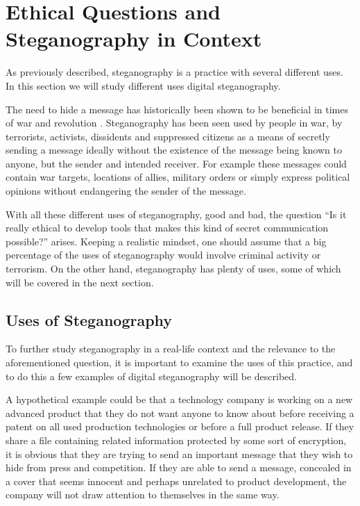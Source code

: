 \section{Ethical Questions and Steganography in Context}
As previously described, steganography is a practice with several different uses.
In this section we will study different uses digital steganography.\vspace*{12pt}

\noindent The need to hide a message has historically been shown to be beneficial in times of war and revolution \citep{Singh2001}.
Steganography has been seen used by people in war, by terrorists, activists, dissidents and suppressed citizens as a means of secretly sending a message ideally without the existence of the message being known to anyone, but the sender and intended receiver.
For example these messages could contain war targets, locations of allies, military orders or simply express political opinions without endangering the sender of the message.

With all these different uses of steganography, good and bad, the question ``Is it really ethical to develop tools that makes this kind of secret communication possible?'' arises.
Keeping a realistic mindset, one should assume that a big percentage of the uses of steganography would involve criminal activity or terrorism.
On the other hand, steganography has plenty of uses, some of which will be covered in the next section.

\subsection{Uses of Steganography}
To further study steganography in a real-life context and the relevance to the aforementioned question, it is important to examine the uses of this practice, and to do this a few examples of digital steganography will be described.

A hypothetical example could be that a technology company is working on a new advanced product that they do not want anyone to know about before receiving a patent on all used production technologies or before a full product release.
If they share a file containing related information protected by some sort of encryption, it is obvious that they are trying to send an important message that they wish to hide from press and competition.
If they are able to send a message, concealed in a cover that seems innocent and perhaps unrelated to product development, the company will not draw attention to themselves in the same way.

